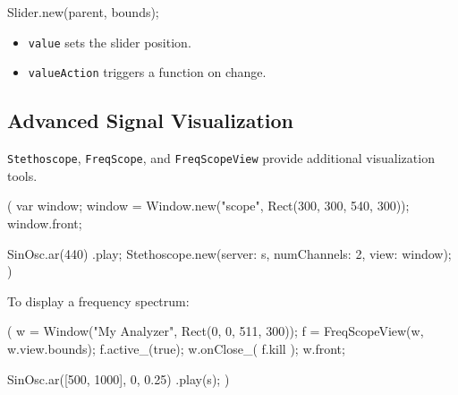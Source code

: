 \begin{supercollider*}
Slider.new(parent, bounds);
\end{supercollider*}

\begin{itemize}
    \item \texttt{value} sets the slider position.
    \item \texttt{valueAction} triggers a function on change.
\end{itemize}

\subsection{Advanced Signal Visualization}

\texttt{Stethoscope}, \texttt{FreqScope}, and \texttt{FreqScopeView} provide additional visualization tools.

\begin{supercollider*}
(
var window;
window = Window.new("scope", Rect(300, 300, 540, 300));
window.front;

{ SinOsc.ar(440) }.play;
Stethoscope.new(server: s, numChannels: 2, view: window);
)
\end{supercollider*}

To display a frequency spectrum:

\begin{supercollider*}
(
w = Window("My Analyzer", Rect(0, 0, 511, 300));
f = FreqScopeView(w, w.view.bounds);
f.active_(true);
w.onClose_({ f.kill });
w.front;

{ SinOsc.ar([500, 1000], 0, 0.25) }.play(s);
)
\end{supercollider*}
